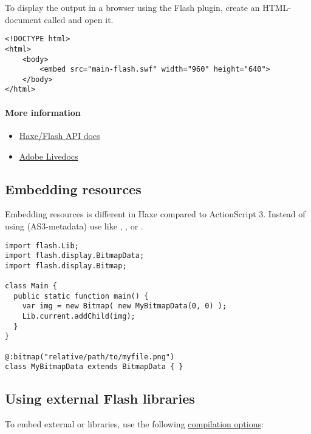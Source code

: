 To display the output in a browser using the Flash plugin, create an HTML-document called  and open it.

\begin{lstlisting}
<!DOCTYPE html>
<html>
	<body>
		<embed src="main-flash.swf" width="960" height="640">
	</body>
</html>
\end{lstlisting}

\paragraph{More information}

\begin{itemize}
	\item \href{https://api.haxe.org/flash/}{Haxe/Flash API docs}
	\item \href{http://help.adobe.com/en_US/FlashPlatform/reference/actionscript/3/}{Adobe Livedocs}
\end{itemize}

\subsection{Embedding resources}
\label{target-flash-resources}

Embedding resources is different in Haxe compared to ActionScript 3. Instead of using \ic{\[embed\]} (AS3-metadata) use  like , ,  or .

\begin{lstlisting}
import flash.Lib;
import flash.display.BitmapData;
import flash.display.Bitmap;

class Main {
  public static function main() {
    var img = new Bitmap( new MyBitmapData(0, 0) );
    Lib.current.addChild(img);
  }
}

@:bitmap("relative/path/to/myfile.png") 
class MyBitmapData extends BitmapData { }
\end{lstlisting}

\subsection{Using external Flash libraries}
\label{target-flash-external-libraries}

To embed external  or  libraries, use the following \href{https://haxe.org/documentation/introduction/compiler-usage.html}{compilation options}:

